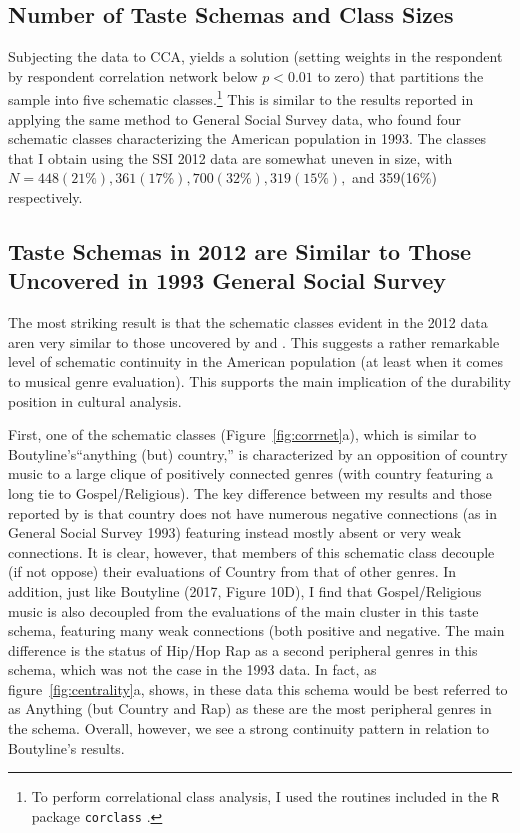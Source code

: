 \documentclass[preprint, authoryear,11pt, 3p]{elsarticle}
\begin{document}
\subsection{Number of Taste Schemas and Class Sizes} 
Subjecting the data to CCA, yields a solution (setting weights in the respondent by respondent correlation network below $p<0.01$ to zero) that partitions the sample into five schematic classes.\footnote{To perform correlational class analysis, I used the routines included in the \texttt{R} package \texttt{corclass} \citep{corclass}.} This is similar to the results reported in \citet{boutyline2017improving} applying the same method to General Social Survey data, who found four schematic classes characterizing the American population in 1993. The classes that I obtain using the SSI 2012 data are somewhat uneven in size, with $N = 448 (21\%), 361 (17\%), 700 (32\%), 319 (15\%),$ and 359(16\%) respectively. 
      
\subsection{Taste Schemas in 2012 are Similar to Those Uncovered in 1993 General Social Survey}
The most striking result is that the schematic classes evident in the 2012 data aren very similar to those uncovered by \citet{goldberg2011mapping} and \citet{boutyline2017improving}. This suggests a rather remarkable level of schematic continuity in the American population (at least when it comes to musical genre evaluation). This supports the main implication of the durability position in cultural analysis.

First, one of the schematic classes (Figure~\ref{fig:corrnet}a), which is similar to Boutyline's``anything (but) country,'' is characterized by an opposition of country music to a large clique of positively connected genres (with country featuring a long tie to Gospel/Religious). The key difference between my results and those reported by \citet{boutyline2017improving} is that country does not have numerous negative connections (as in General Social Survey 1993) featuring instead mostly absent or very weak connections. It is clear, however, that members of this schematic class decouple (if not oppose) their evaluations of Country from that of other genres. In addition, just like Boutyline (2017, Figure 10D), I find that Gospel/Religious music is also decoupled from the evaluations of the main cluster in this taste schema, featuring many weak connections (both positive and negative. The main difference is the status of Hip/Hop Rap as a second peripheral genres in this schema, which was not the case in the 1993 data. In fact, as figure~\ref{fig:centrality}a, shows, in these data this schema would be best referred to as Anything (but Country and Rap) as these are the most peripheral genres in the schema. Overall, however, we see a strong continuity pattern in relation to Boutyline's results.  
\end{document}
